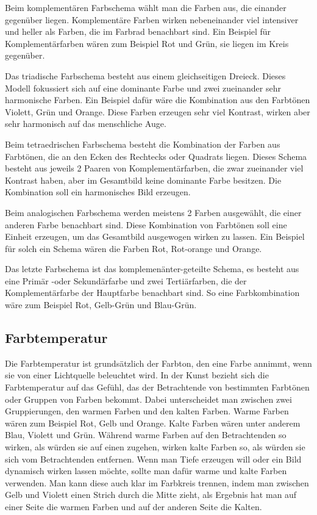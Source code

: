 Beim komplementären Farbschema wählt man die Farben aus, die einander gegenüber liegen. Komplementäre Farben wirken nebeneinander viel intensiver und heller als Farben, die im Farbrad benachbart sind. Ein Beispiel für Komplementärfarben wären zum Beispiel Rot und Grün, sie liegen im Kreis gegenüber.
\cite{_special_subjects}

Das triadische Farbschema besteht aus einem gleichseitigen Dreieck. Dieses Modell fokussiert sich auf eine dominante Farbe und zwei zueinander sehr harmonische Farben. Ein Beispiel dafür wäre die Kombination aus den Farbtönen Violett, Grün und Orange. Diese Farben erzeugen sehr viel Kontrast, wirken aber sehr harmonisch auf das menschliche Auge. 
\cite{_special_subjects}

Beim tetraedrischen Farbschema besteht die Kombination der Farben aus Farbtönen, die an den Ecken des Rechtecks oder Quadrats liegen. Dieses Schema besteht aus jeweils 2 Paaren von Komplementärfarben, die zwar zueinander viel Kontrast haben, aber im Gesamtbild keine dominante Farbe besitzen. Die Kombination soll ein harmonisches Bild erzeugen.
\cite{_special_subjects}

Beim analogischen Farbschema werden meistens 2 Farben ausgewählt, die einer anderen Farbe benachbart sind. Diese Kombination von Farbtönen soll eine Einheit erzeugen, um das Gesamtbild ausgewogen wirken zu lassen. Ein Beispiel für solch ein Schema wären die Farben Rot, Rot-orange und Orange.
\cite{_special_subjects}

Das letzte Farbschema ist das komplemenänter-geteilte Schema, es besteht aus eine Primär -oder Sekundärfarbe und zwei Tertiärfarben, die der Komplementärfarbe der Hauptfarbe benachbart sind. So eine Farbkombination wäre zum Beispiel Rot, Gelb-Grün und Blau-Grün.
\cite{_special_subjects}


\subsection{Farbtemperatur}
Die Farbtemperatur ist grundsätzlich der Farbton, den eine Farbe annimmt, wenn sie von einer Lichtquelle beleuchtet wird. In der Kunst bezieht sich die Farbtemperatur auf das Gefühl, das der Betrachtende von bestimmten Farbtönen oder Gruppen von Farben bekommt. Dabei unterscheidet man zwischen zwei Gruppierungen, den warmen Farben und den kalten Farben. Warme Farben wären zum Beispiel Rot, Gelb und Orange. Kalte Farben wären unter anderem Blau, Violett und Grün. Während warme Farben auf den Betrachtenden so wirken, als würden sie auf einen zugehen, wirken kalte Farben so, als würden sie sich vom Betrachtenden entfernen. Wenn man Tiefe erzeugen will oder ein Bild dynamisch wirken lassen möchte, sollte man dafür warme und kalte Farben verwenden. Man kann diese auch klar im Farbkreis trennen, indem man zwischen Gelb und Violett einen Strich durch die Mitte zieht, als Ergebnis hat man auf einer Seite die warmen Farben und auf der anderen Seite die Kalten.
\cite{_special_subjects}
\cite{_line_color_form}

